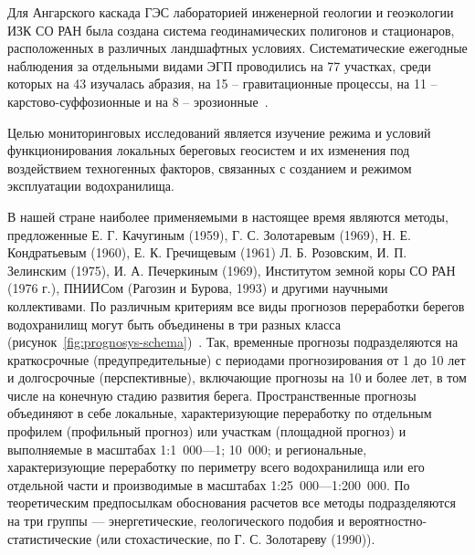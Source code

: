 \documentclass[732,fontsize=14pt,final]{studrep}
\begin{document}
Для Ангарского каскада ГЭС лабораторией инженерной геологии и геоэкологии ИЗК СО РАН была создана система геодинамических полигонов и стационаров, расположенных в различных ландшафтных условиях. Систематические ежегодные наблюдения за отдельными видами ЭГП проводились на 77 участках, среди которых на 43 изучалась абразия, на 15 -- гравитационные процессы, на 11 -- карстово-суффозионные и на 8 -- эрозионные~\cite{koz18}.

Целью мониторинговых исследований является изучение режима и условий функционирования локальных береговых геосистем и их изменения под воздействием техногенных факторов, связанных с созданием и режимом эксплуатации водохранилища.

В нашей стране наиболее применяемыми в настоящее время являются методы, предложенные Е. Г. Качугиным (1959), Г. С. Золотаревым (1969), Н. Е. Кондратьевым (1960), Е. К. Гречищевым (1961) Л. Б. Розовским, И. П. Зелинским (1975), И. А. Печеркиным (1969), Институтом земной коры СО РАН (1976 г.), ПНИИСом (Рагозин и Бурова, 1993) и другими научными коллективами.
По различным критериям все виды прогнозов переработки берегов водохранилищ могут быть объединены в три разных класса (рисунок~\ref{fig:prognosys-schema})~\cite{ivanov01}. Так, временные прогнозы подразделяются на краткосрочные (предупредительные) с периодами прогнозирования от 1 до 10 лет и долгосрочные (перспективные), включающие прогнозы на 10 и более лет, в том числе на конечную стадию развития берега. Пространственные прогнозы объединяют в себе локальные, ха­рактеризующие переработку по отдельным профилем (профильный прогноз) или участкам (площадной прогноз) и выполняемые в масштабах 1:1~000—1; 10~000; и региональные, характеризующие переработку по периметру всего водохранилища или его отдель­ной части и производимые в масштабах 1:25~000—1:200~000. По теоретическим предпосылкам обоснования расчетов все методы подразделяются на три группы — энергетические, геологического подобия и вероятностно-статистические (или стохастические, по Г. С. Золотареву (1990)).
\end{document}
